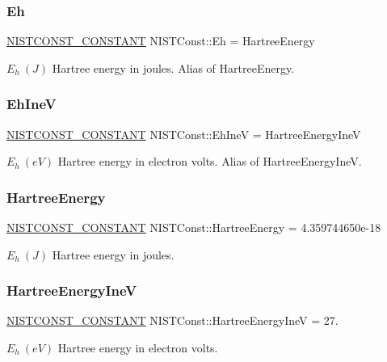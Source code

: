 \subsubsection{\texorpdfstring{Eh}{Eh}}
{\footnotesize\ttfamily \mbox{\hyperlink{group___n_i_s_t_const-_macros_ga2b0fc1d7452373f816175dd86ce26729}{N\+I\+S\+T\+C\+O\+N\+S\+T\+\_\+\+C\+O\+N\+S\+T\+A\+NT}} N\+I\+S\+T\+Const\+::\+Eh = Hartree\+Energy}

$E_h \ (J)$ Hartree energy in joules. Alias of Hartree\+Energy. \mbox{\label{group___n_i_s_t_const-_hartree_energy_gaca634681543c1987792567e60836c133}} 
\subsubsection{\texorpdfstring{Eh\+IneV}{EhIneV}}
{\footnotesize\ttfamily \mbox{\hyperlink{group___n_i_s_t_const-_macros_ga2b0fc1d7452373f816175dd86ce26729}{N\+I\+S\+T\+C\+O\+N\+S\+T\+\_\+\+C\+O\+N\+S\+T\+A\+NT}} N\+I\+S\+T\+Const\+::\+Eh\+IneV = Hartree\+Energy\+IneV}

$E_h \ (eV)$ Hartree energy in electron volts. Alias of Hartree\+Energy\+IneV. \mbox{\label{group___n_i_s_t_const-_hartree_energy_ga07857f3a1e5865454cf529241763954f}} 
\subsubsection{\texorpdfstring{Hartree\+Energy}{HartreeEnergy}}
{\footnotesize\ttfamily \mbox{\hyperlink{group___n_i_s_t_const-_macros_ga2b0fc1d7452373f816175dd86ce26729}{N\+I\+S\+T\+C\+O\+N\+S\+T\+\_\+\+C\+O\+N\+S\+T\+A\+NT}} N\+I\+S\+T\+Const\+::\+Hartree\+Energy = 4.\+359744650e-\/18}

$E_h \ (J)$ Hartree energy in joules. \mbox{\label{group___n_i_s_t_const-_hartree_energy_ga1b1d1cd8f70b3b70ad1e4a3347aac2ae}} 
\subsubsection{\texorpdfstring{Hartree\+Energy\+IneV}{HartreeEnergyIneV}}
{\footnotesize\ttfamily \mbox{\hyperlink{group___n_i_s_t_const-_macros_ga2b0fc1d7452373f816175dd86ce26729}{N\+I\+S\+T\+C\+O\+N\+S\+T\+\_\+\+C\+O\+N\+S\+T\+A\+NT}} N\+I\+S\+T\+Const\+::\+Hartree\+Energy\+IneV = 27.}

$E_h \ (eV)$ Hartree energy in electron volts. 